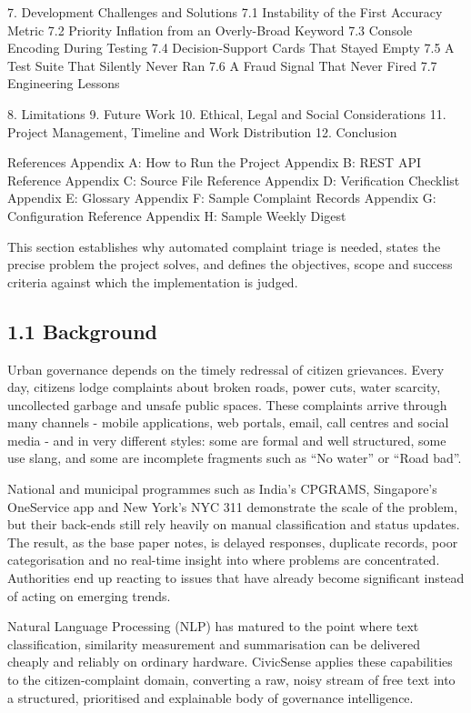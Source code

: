 \documentclass[10pt,letterpaper,oneside]{article}\usepackage{geometry}\geometry{top=1in,bottom=1in,left=1in,right=1in,includeheadfoot}\usepackage{xcolor}\definecolor{color@navy}{HTML}{1F3B63}\definecolor{color@grey}{HTML}{404040}\definecolor{color@hdr}{HTML}{F2F4F7}\usepackage{titlesec}\titleformat{\section}  {\normalfont\huge\bfseries\color@navy}  {}{0pt}{\MakeUppercase}\titleformat{\subsection}  {\normalfont\Large\bfseries\color@navy}  {}{0pt}{}\titleformat{\subsubsection}  {\normalfont\large\bfseries\color@navy}  {}{0pt}{}\titlespacing*{\section}{0pt}{14pt}{6pt}\titlespacing*{\subsection}{0pt}{10pt}{4pt}\titlespacing*{\subsubsection}{0pt}{8pt}{3pt}\setlength{\parindent}{0pt}\setlength{\parskip}{0.6em}\parindent=0pt\usepackage{enumitem}\setlist{nosep,leftmargin=*,itemsep=0pt,topsep=2pt,partopsep=0pt}\usepackage{array}\usepackage{booktabs}\usepackage{caption}\captionsetup{font={small,it},labelfont={bf},labelsep=period,  parskip=2pt,skip=4pt,list=no}\captionsetup[table]{labelfont={bf,small,color@navy},name=Table}\usepackage{graphicx}\usepackage{verbatim}\usepackage{ragged2e}\usepackage{longtable}\usepackage{tabularx}\usepackage{multirow}\usepackage{colortbl}\definecolor{rowshade}{HTML}{F2F4F7}\usepackage{tikz}\usetikzlibrary{positioning,calc}\usepackage[hidelinks]{hyperref}\hypersetup{colorlinks=true,linkcolor=color@navy,urlcolor=color@navy}\pagestyle{fancy}\fancyhf{}\renewcommand{\headrulewidth}{0.4pt}\fancyhead[L]{\small\color@navy CivicSense — Project Report}\fancyhead[R]{\small\color@grey October 11, 2026}\fancyfoot[C]{\small\color@grey An Integrated Intelligent Triage Pipelin}\fancyfoot[R]{\small\color@grey Page \thepage}\usepackage{setspace}\setstretch{1.15}\AtBeginDocument{  \hypersetup{pdftitle={An Integrated Intelligent Triage Pipeline for AI-Enhanced Citizen Complaint Management},    pdfauthor={CivicSense Project Team},    pdfsubject={Project Report},    pdfkeywords={smart cities, NLP, complaint management, e-governance},    pdfcreator={CivicSense Project Team}  }}
\begin{document}
7. Development Challenges and Solutions
   7.1 Instability of the First Accuracy Metric
   7.2 Priority Inflation from an Overly-Broad Keyword
   7.3 Console Encoding During Testing
   7.4 Decision-Support Cards That Stayed Empty
   7.5 A Test Suite That Silently Never Ran
   7.6 A Fraud Signal That Never Fired
   7.7 Engineering Lessons

8. Limitations
9. Future Work
10. Ethical, Legal and Social Considerations
11. Project Management, Timeline and Work Distribution
12. Conclusion

References
Appendix A: How to Run the Project
Appendix B: REST API Reference
Appendix C: Source File Reference
Appendix D: Verification Checklist
Appendix E: Glossary
Appendix F: Sample Complaint Records
Appendix G: Configuration Reference
Appendix H: Sample Weekly Digest


\clearpage
{}

This section establishes why automated complaint triage is needed, states the precise problem the project solves, and defines the objectives, scope and success criteria against which the implementation is judged.

\subsection*{1.1 Background}
Urban governance depends on the timely redressal of citizen grievances. Every day, citizens lodge complaints about broken roads, power cuts, water scarcity, uncollected garbage and unsafe public spaces. These complaints arrive through many channels - mobile applications, web portals, email, call centres and social media - and in very different styles: some are formal and well structured, some use slang, and some are incomplete fragments such as “No water” or “Road bad”.

National and municipal programmes such as India’s CPGRAMS, Singapore’s OneService app and New York’s NYC 311 demonstrate the scale of the problem, but their back-ends still rely heavily on manual classification and status updates. The result, as the base paper notes, is delayed responses, duplicate records, poor categorisation and no real-time insight into where problems are concentrated. Authorities end up reacting to issues that have already become significant instead of acting on emerging trends.

Natural Language Processing (NLP) has matured to the point where text classification, similarity measurement and summarisation can be delivered cheaply and reliably on ordinary hardware. CivicSense applies these capabilities to the citizen-complaint domain, converting a raw, noisy stream of free text into a structured, prioritised and explainable body of governance intelligence.
\end{document}

